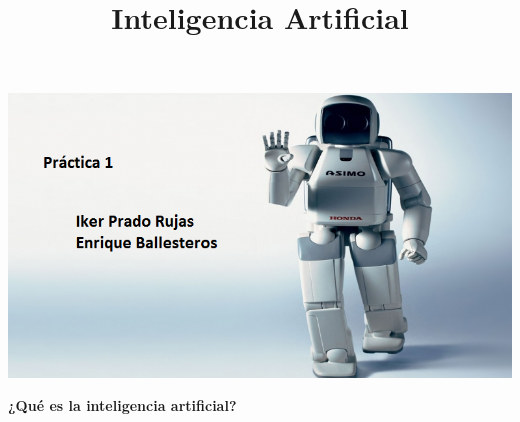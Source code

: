 \documentclass[spanish, a4paper, 12pt]{article} 	%
\begin{document}
\title{\textbf{Inteligencia Artificial}}
\maketitle

\begin{center}
{\includegraphics[width=\textwidth]{robotHonda.png}}
\end{center}

\newpage
\textbf{{¿Qué es la inteligencia artificial?}}
\end{document}
